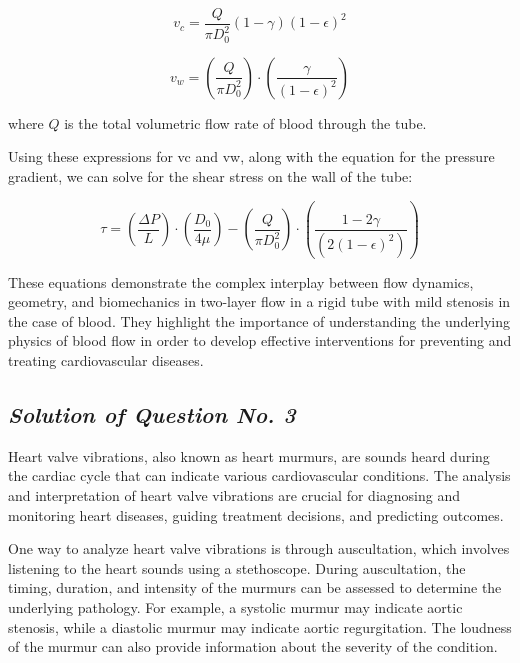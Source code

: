\documentclass[12pt, a4paper]{article} %
\begin{document}
\begin{equation*}
    v_c = \frac{Q}{\pi D^2_0}\left(1-\gamma\right)\left(1-\epsilon\right)^2
\end{equation*}

\begin{equation*}
    v_w = \left(\frac{Q}{\pi D^2_0}\right)\cdot\left(\frac{\gamma}{\left(1-\epsilon\right)^2}\right)
\end{equation*}

where $Q$ is the total volumetric flow rate of blood through the tube.

Using these expressions for vc and vw, along with the equation for the pressure gradient, we can solve for the shear stress on the wall of the tube:

\begin{equation*}
    \tau = \left(\frac{\Delta P}{L}\right)\cdot\left(\frac{D_0}{4\mu}\right) - \left(\frac{Q}{\pi D^2_0}\right)\cdot\left(\frac{1-2\gamma}{\left(2\left(1-\epsilon\right)^2\right)}\right) 
\end{equation*}

These equations demonstrate the complex interplay between flow dynamics, geometry, and biomechanics in two-layer flow in a rigid tube with mild stenosis in the case of blood. They highlight the importance of understanding the underlying physics of blood flow in order to develop effective interventions for preventing and treating cardiovascular diseases.

\subsection{\slshape Solution of Question No. 3}
Heart valve vibrations, also known as heart murmurs, are sounds heard during the cardiac cycle that can indicate various cardiovascular conditions. The analysis and interpretation of heart valve vibrations are crucial for diagnosing and monitoring heart diseases, guiding treatment decisions, and predicting outcomes.

One way to analyze heart valve vibrations is through auscultation, which involves listening to the heart sounds using a stethoscope. During auscultation, the timing, duration, and intensity of the murmurs can be assessed to determine the underlying pathology. For example, a systolic murmur may indicate aortic stenosis, while a diastolic murmur may indicate aortic regurgitation. The loudness of the murmur can also provide information about the severity of the condition.
\end{document}
